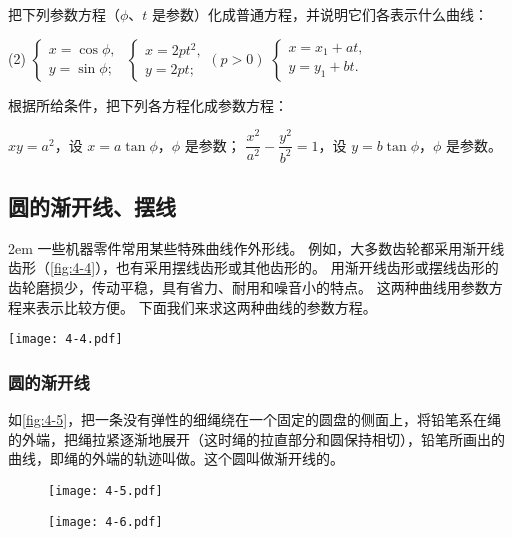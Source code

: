 \begin{Practice}
  \begin{question}
    \item 把下列参数方程（$\phi$、$t$ 是参数）化成普通方程，并说明它们各表示什么曲线：
    \begin{tasks}(2)
      \task $\begin{cases}x=\cos\phi,\\y=\sin\phi; \end{cases}$
      \task $\begin{cases}x=2pt^2,\\y=2pt; \end{cases}(p>0)$
      \task $\begin{cases}x=x_1+at,\\y=y_1+bt. \end{cases}$
    \end{tasks}
    \item 根据所给条件，把下列各方程化成参数方程：
    \begin{tasks}
      \task $xy=a^2$，设 $x=a\tan\phi$，$\phi$ 是参数；
      \task $\dfrac{x^2}{a^2}-\dfrac{y^2}{b^2}=1$，设 $y=b\tan\phi$，$\phi$ 是参数。
    \end{tasks}
  \end{question}
\end{Practice}

\subsection{圆的渐开线、摆线}
\medskip\noindent
\begin{minipage}{0.5\linewidth}\parindent2em
一些机器零件常用某些特殊曲线作外形线。
例如，大多数齿轮都采用渐开线齿形（\cref{fig:4-4}），也有采用摆线齿形或其他齿形的。
用渐开线齿形或摆线齿形的齿轮磨损少，传动平稳，具有省力、耐用和噪音小的特点。
这两种曲线用参数方程来表示比较方便。
下面我们来求这两种曲线的参数方程。
\end{minipage}\hfill
\begin{minipage}{0.45\linewidth}\centering
\begin{figurehere}
  \texttt{[image: 4-4.pdf]}
  \caption{}\label{fig:4-4}
\end{figurehere}
\end{minipage}

\subsubsection{圆的渐开线}
如\cref{fig:4-5}，把一条没有弹性的细绳绕在一个固定的圆盘的侧面上，将铅笔系在绳的外端，把绳拉紧逐渐地展开（这时绳的拉直部分和圆保持相切），铅笔所画出的曲线，即绳的外端的轨迹叫做。这个圆叫做渐开线的。
\begin{figure}
  \begin{minipage}[b]{0.48\linewidth}\centering
    \texttt{[image: 4-5.pdf]}
    \caption{}\label{fig:4-5}
  \end{minipage}
  \begin{minipage}[b]{0.48\linewidth}\centering
    \texttt{[image: 4-6.pdf]}
    \caption{}\label{fig:4-6}
  \end{minipage}
\end{figure}

